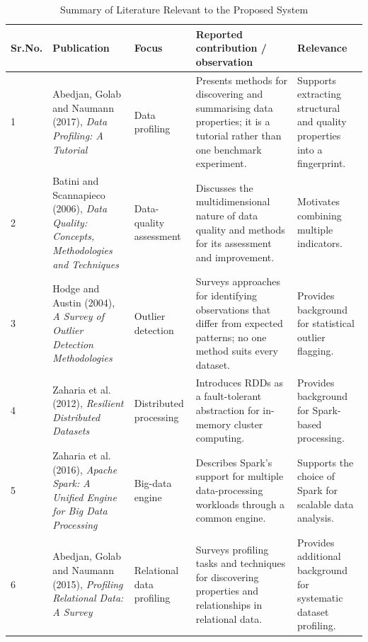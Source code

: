 \documentclass[12pt,a4paper]{report}
\begin{document}
\renewcommand{\arraystretch}{1.2}
\begin{table}[H]
\centering
\begin{tabular}{|p{1.5cm}|p{3.0cm}|p{2.5cm}|p{3.5cm}|p{3.0cm}|}
\hline
\textbf{Sr.No.} & \textbf{Publication} & \textbf{Focus} & \textbf{Reported contribution / observation} & \textbf{Relevance}\\
\hline
1 & Abedjan, Golab and Naumann (2017), \textit{Data Profiling: A Tutorial} \cite{abedjan2017} & Data profiling & Presents methods for discovering and summarising data properties; it is a tutorial rather than one benchmark experiment. & Supports extracting structural and quality properties into a fingerprint.\\
\hline
2 & Batini and Scannapieco (2006), \textit{Data Quality: Concepts, Methodologies and Techniques} \cite{batini2006} & Data-quality assessment & Discusses the multidimensional nature of data quality and methods for its assessment and improvement. & Motivates combining multiple indicators.\\
\hline
3 & Hodge and Austin (2004), \textit{A Survey of Outlier Detection Methodologies} \cite{hodge2004} & Outlier detection & Surveys approaches for identifying observations that differ from expected patterns; no one method suits every dataset. & Provides background for statistical outlier flagging.\\
\hline
4 & Zaharia et al. (2012), \textit{Resilient Distributed Datasets} \cite{zaharia2012} & Distributed processing & Introduces RDDs as a fault-tolerant abstraction for in-memory cluster computing. & Provides background for Spark-based processing.\\
\hline
5 & Zaharia et al. (2016), \textit{Apache Spark: A Unified Engine for Big Data Processing} \cite{zaharia2016} & Big-data engine & Describes Spark's support for multiple data-processing workloads through a common engine. & Supports the choice of Spark for scalable data analysis.\\
\hline
6 & Abedjan, Golab and Naumann (2015), \textit{Profiling Relational Data: A Survey} \cite{abedjan2015} & Relational data profiling & Surveys profiling tasks and techniques for discovering properties and relationships in relational data. & Provides additional background for systematic dataset profiling.\\
\hline
\end{tabular}
\caption{Summary of Literature Relevant to the Proposed System}\label{tab:literature_review}
\end{table}
\end{document}
